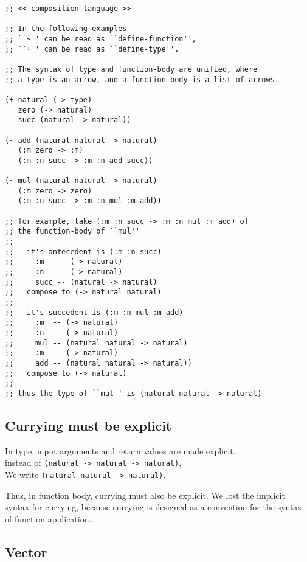 \documentclass[numbers]{sigplanconf}
\begin{document}
\newpage

{\scriptsize\begin{verbatim}
;; << composition-language >>

;; In the following examples
;; ``~'' can be read as ``define-function'',
;; ``+'' can be read as ``define-type''.

;; The syntax of type and function-body are unified, where
;; a type is an arrow, and a function-body is a list of arrows.

(+ natural (-> type)
   zero (-> natural)
   succ (natural -> natural))

(~ add (natural natural -> natural)
   (:m zero -> :m)
   (:m :n succ -> :m :n add succ))

(~ mul (natural natural -> natural)
   (:m zero -> zero)
   (:m :n succ -> :m :n mul :m add))

;; for example, take (:m :n succ -> :m :n mul :m add) of
;; the function-body of ``mul''
;;
;;   it's antecedent is (:m :n succ)
;;     :m   -- (-> natural)
;;     :n   -- (-> natural)
;;     succ -- (natural -> natural)
;;   compose to (-> natural natural)
;;
;;   it's succedent is (:m :n mul :m add)
;;     :m  -- (-> natural)
;;     :n  -- (-> natural)
;;     mul -- (natural natural -> natural)
;;     :m  -- (-> natural)
;;     add -- (natural natural -> natural))
;;   compose to (-> natural)
;;
;; thus the type of ``mul'' is (natural natural -> natural)
\end{verbatim}}

\subsection{Currying must be explicit}

In type, input arguments and return values are made explicit. \\
instead of {\scriptsize\verb|(natural -> natural -> natural)|}, \\
We write {\scriptsize\verb|(natural natural -> natural)|}.

Thus, in function body, currying must also be explicit.
We lost the implicit syntax for currying,
because currying is designed as a convention
for the syntax of function application.

\subsection{Vector}
\end{document}

